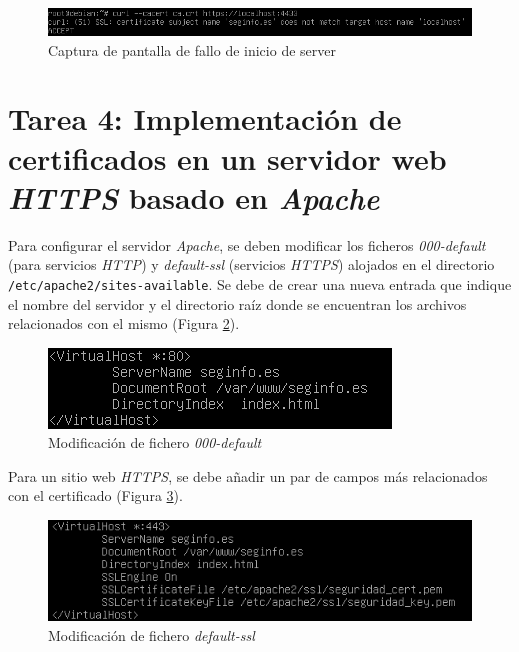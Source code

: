 \documentclass[10pt,a4paper]{article}
\begin{document}
\begin{figure}[h!]
	\centering
	\includegraphics[scale=0.6]{images/tarea4_paso2.png}
	\caption{Captura de pantalla de fallo de inicio de server}
	\label{fig:tarea3_localhost}
\end{figure}


\newpage
\section{Tarea 4: Implementación de certificados en un servidor web \emph{HTTPS} basado en \emph{Apache}}

Para configurar el servidor \textit{Apache}, se deben modificar los ficheros \textit{000-default} (para servicios \textit{HTTP}) y \textit{default-ssl} (servicios \textit{HTTPS}) alojados en el directorio \texttt{/etc/apache2/sites-available}. Se debe de crear una nueva entrada que indique el nombre del servidor y el directorio raíz donde se encuentran los archivos relacionados con el mismo (Figura \ref{fig:tarea4_000default}). \\

\begin{figure}[h!]
	\centering
	\includegraphics[scale=0.6]{images/tarea4_000default.png}
	\caption{Modificación de fichero \textit{000-default}}
	\label{fig:tarea4_000default}
\end{figure}

Para un sitio web \textit{HTTPS}, se debe añadir un par de campos más relacionados con el certificado (Figura \ref{fig:tarea4_defaultssl}).\\

\begin{figure}[h!]
	\centering
	\includegraphics[scale=0.6]{images/tarea4_defaultssl.png}
	\caption{Modificación de fichero \textit{default-ssl}}
	\label{fig:tarea4_defaultssl}
\end{figure}
\end{document}
